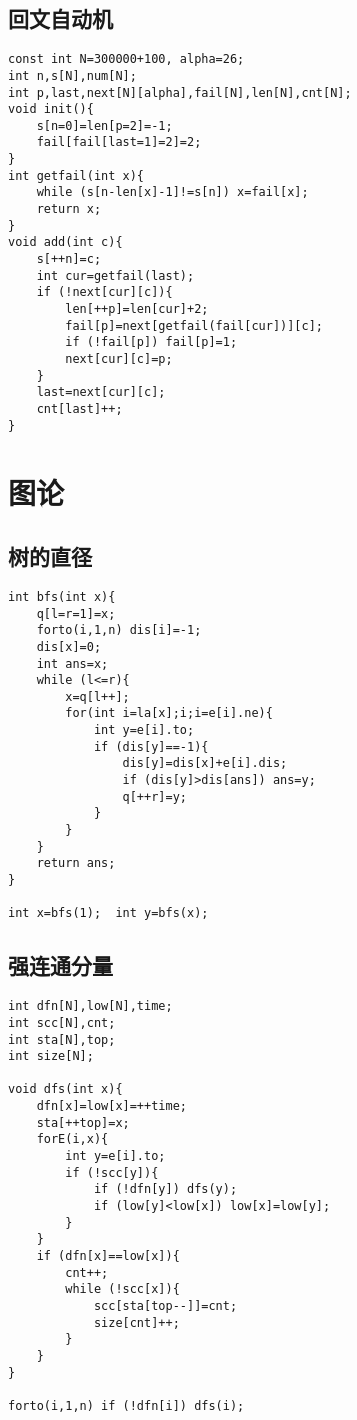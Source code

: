 \documentclass{article}
\begin{document}
\subsection{回文自动机}
\begin{lstlisting}
const int N=300000+100, alpha=26;
int n,s[N],num[N];
int p,last,next[N][alpha],fail[N],len[N],cnt[N];
void init(){
	s[n=0]=len[p=2]=-1;
	fail[fail[last=1]=2]=2;
}
int getfail(int x){
	while (s[n-len[x]-1]!=s[n]) x=fail[x];
	return x;
}
void add(int c){
	s[++n]=c;
	int cur=getfail(last);
	if (!next[cur][c]){
		len[++p]=len[cur]+2;
		fail[p]=next[getfail(fail[cur])][c];
		if (!fail[p]) fail[p]=1;
		next[cur][c]=p;
	}
	last=next[cur][c];
	cnt[last]++;
}
\end{lstlisting}


\section{图论}

\subsection{树的直径}
\begin{lstlisting}
int bfs(int x){
	q[l=r=1]=x;
	forto(i,1,n) dis[i]=-1;
	dis[x]=0;
	int ans=x;
	while (l<=r){
		x=q[l++];
		for(int i=la[x];i;i=e[i].ne){
			int y=e[i].to;
			if (dis[y]==-1){
				dis[y]=dis[x]+e[i].dis;
				if (dis[y]>dis[ans]) ans=y;
				q[++r]=y;
			}
		}
	}
	return ans;
}

int x=bfs(1);  int y=bfs(x);
\end{lstlisting}

\subsection{强连通分量}
\begin{lstlisting}
int dfn[N],low[N],time;
int scc[N],cnt;
int sta[N],top;
int size[N];

void dfs(int x){
    dfn[x]=low[x]=++time;
    sta[++top]=x;
    forE(i,x){
        int y=e[i].to;
        if (!scc[y]){
            if (!dfn[y]) dfs(y);
            if (low[y]<low[x]) low[x]=low[y];
        }
    }
    if (dfn[x]==low[x]){
        cnt++;
        while (!scc[x]){
            scc[sta[top--]]=cnt;
            size[cnt]++;
        }
    }
}

forto(i,1,n) if (!dfn[i]) dfs(i);
\end{lstlisting}
\end{document}
